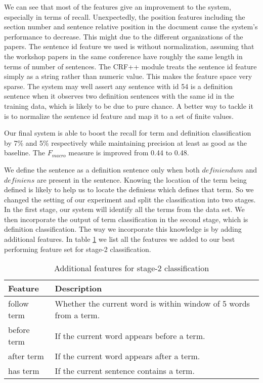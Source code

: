 \documentclass[hyp]{socreport}
\begin{document}
We can see that most of the features give an improvement to the system, especially in terms of recall. Unexpectedly, the position features including the section number and sentence relative position in the document cause the system’s performance to decrease. This might due to the different organizations of the papers. The sentence id feature we used is without normalization, assuming that the workshop papers in the same conference have roughly the same length in terms of number of sentences. The CRF++ module treats the sentence id feature simply as a string rather than numeric value. This makes the feature space very sparse. The system may well assert any sentence with id 54 is a definition sentence when it observes two definition sentences with the same id in the training data, which is likely to be due to pure chance. A better way to tackle it is to normalize the sentence id feature and map it to a set of finite values.   

Our final system is able to boost the recall for term and definition classification by 7\% and 5\% respectively while maintaining precision at least as good as the baseline. The $F_{macro}$ measure is improved from 0.44 to 0.48.  

We define the sentence as a definition sentence only when both $definiendum$ and $definiens$ are present in the sentence. Knowing the location of the term being defined is likely to help us to locate the definiens which defines that term. So we changed the setting of our experiment and split the classification into two stages. In the first stage, our system will identify all the terms from the data set. We then incorporate the output of term classification in the second stage, which is definition classification. The way we incorporate this knowledge is by adding additional features. In table \ref{s2feature} we list all the features we added to our best performing feature set for stage-2 classification.

\begin{table}
	
    \centering
    \begin{tabular}{|p{2.2cm}|p{12cm}|}
\hline
        \bf{Feature}                            & \bf{Description}     \\ \hline
        follow term     & Whether the current word is within window of 5 words from a term.
\\ \hline
       before term    & If the current word appears before a term. \\ 
        \hline
        after term                            & If the current word appears after a term.
     \\ \hline
        has term    & If the current sentence contains a term. 
\\ \hline     
    \end{tabular}
    \caption{Additional features for stage-2 classification}
    \label{s2feature}
\end{table}
\end{document}
